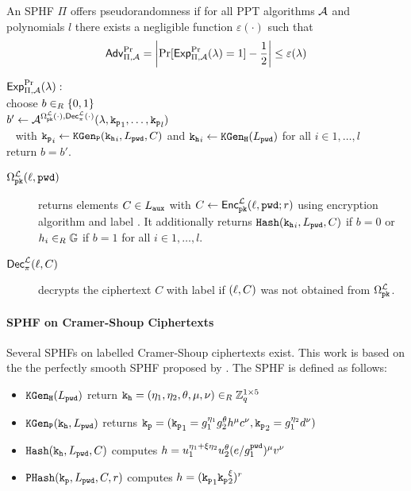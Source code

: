 \begin{definition}[Pseudorandomness]\label{def:prplusc}
An \ac{SPHF} $\Pi$ offers pseudorandomness if for all PPT algorithms $\mathcal{A}$ and polynomials $l$ there exists a negligible function $\varepsilon(\cdot)$ such that
\[\mathsf{Adv}_{\Pi,\mathcal{A}}^{\Pr}=\left|\Pr[\mathsf{Exp}_{\Pi,\mathcal{A}}^{\Pr}(\lambda)=1] - \frac12 \right|\leq \varepsilon(\lambda)\]

\noindent
$\mathsf{Exp}_{\Pi,\mathcal{A}}^{\Pr}(\lambda):$ \\
\hspace*{2em} choose $b\in_R\{0,1\}$\\
\hspace*{2em} $b'\gets\mathcal{A}^{\Omega^{\mathcal{L}}_\mathtt{pk}(\cdot),\mathsf{Dec}^\mathcal{L}_\pi(\cdot)}(\lambda,\mathtt{k_p}_1,\dots,\mathtt{k_p}_l)$ \\
\hspace*{4em}~ with $\mathtt{k_p}_i\gets\mathtt{KGen_P}(\mathtt{k_h}_i,L_\mathtt{pwd},C)$ and $\mathtt{k_h}_i\gets\mathtt{KGen_H}(L_\mathtt{pwd})$ for all $i\in 1,\dots,l$ \\
\hspace*{2em} return $b=b'$.

\begin{description}
	\item[$\Omega^{\mathcal{L}}_\mathtt{pk}(\ell,\mathtt{pwd})$] returns elements $C\in L_\mathtt{aux}$ with $C\gets\mathsf{Enc}^\mathcal{L}_\mathtt{pk}(\ell,\allowbreak\mathtt{pwd};r)$ using encryption algorithm \cL and label \Label.
    	It additionally returns $\mathtt{Hash}(\mathtt{k_h}_{i},L_\mathtt{pwd},C)$ if $b=0$ or $h_{i}\in_R\mathbb{G}$ if $b=1$ for all $i\in 1,\dots, l$.
	
	\item[$\mathsf{Dec}^\mathcal{L}_\pi(\ell,C)$] decrypts the ciphertext $C$ with label \Label if $(\ell,C)$ was not obtained from $\Omega^\mathcal{L}_\mathtt{pk}$.
\end{description}
\end{definition}

\paragraph{SPHF on Cramer-Shoup Ciphertexts}
Several \acp{SPHF} on labelled Cramer-Shoup ciphertexts exist.
This work is based on the the perfectly smooth \ac{SPHF} proposed by \citet{Benhamouda2013}.
The \ac{SPHF} is defined as follows:
\begin{itemize}
  \item $\mathtt{KGen_H}(L_\mathtt{pwd})$ return $\mathtt{k_h}=(\eta_1,\eta_2,\theta,\mu,\nu)\in_R\mathbb{Z}_q^{1\times 5}$
  \item $\mathtt{KGen_P}(\mathtt{k_h}, L_\mathtt{pwd})$ returns $\mathtt{k_p}=(\mathtt{k_p}_1=g_1^{\eta_1} g_2^{\theta} h^\mu c^\nu, \mathtt{k_p}_2=g_1^{\eta_2} d^{\nu})$
  \item $\mathtt{Hash}(\mathtt{k_h}, L_\mathtt{pwd}, C)$ computes $h=u_1^{\eta_1+\xi\eta_2} u_2^{\theta} (e/g_1^{\mathtt{pwd}})^\mu v^\nu$
  \item $\mathtt{PHash}(\mathtt{k_p}, L_\mathtt{pwd}, C, r)$ computes $h=(\mathtt{k_p}_1 \mathtt{k_p}_2^\xi)^r$
\end{itemize}

